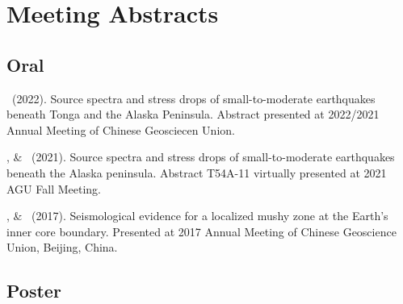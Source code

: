 \section{Meeting Abstracts}

\subsection{Oral}

\begin{etaremune}
\item \Me\ (2022).
	Source spectra and stress drops of small-to-moderate earthquakes beneath Tonga and the Alaska Peninsula.
	Abstract presented at 2022/2021 Annual Meeting of Chinese Geosciecen Union.
\item \Me, \& \SWei\ (2021).
    Source spectra and stress drops of small-to-moderate earthquakes beneath the Alaska peninsula.
    Abstract T54A-11 virtually presented at 2021 AGU Fall Meeting.
\item
    \Me, \& \LWen\ (2017).
    Seismological evidence for a localized mushy zone at the Earth's inner core boundary.
    Presented at 2017 Annual Meeting of Chinese Geoscience Union, Beijing, China.
\end{etaremune}

\subsection{Poster}

